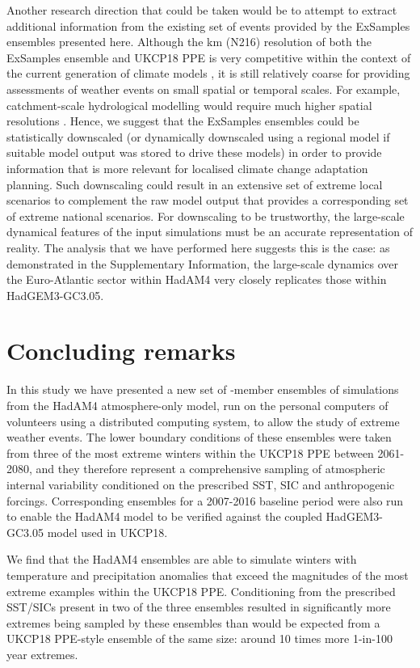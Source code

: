   Another research direction that could be taken would be to attempt to extract additional information from the existing set of events provided by the ExSamples ensembles presented here. Although the  km (N216) resolution of both the ExSamples ensemble and UKCP18 PPE is very competitive within the context of the current generation of climate models \citep{cmip6_source_id_values_cmip6_2022,eyring_overview_2016}, it is still relatively coarse for providing assessments of weather events on small spatial or temporal scales. For example, catchment-scale hydrological modelling would require much higher spatial resolutions \citep{charlton_assessing_2006}. Hence, we suggest that the ExSamples ensembles could be statistically downscaled (or dynamically downscaled using a regional model if suitable model output was stored to drive these models) in order to provide information that is more relevant for localised climate change adaptation planning. Such downscaling could result in an extensive set of extreme local scenarios to complement the raw model output that provides a corresponding set of extreme national scenarios. For downscaling to be trustworthy, the large-scale dynamical features of the input simulations must be an accurate representation of reality. The analysis that we have performed here suggests this is the case: as demonstrated in the Supplementary Information, the large-scale dynamics over the Euro-Atlantic sector within HadAM4 very closely replicates those within HadGEM3-GC3.05.
    
\section{Concluding remarks}

  In this study we have presented a new set of -member ensembles of simulations from the HadAM4 atmosphere-only model, run on the personal computers of volunteers using a distributed computing system, to allow the study of extreme weather events. The lower boundary conditions of these ensembles were taken from three of the most extreme winters within the UKCP18 PPE between 2061-2080, and they therefore represent a comprehensive sampling of atmospheric internal variability conditioned on the prescribed SST, SIC and anthropogenic forcings. Corresponding ensembles for a 2007-2016 baseline period were also run to enable the HadAM4 model to be verified against the coupled HadGEM3-GC3.05 model used in UKCP18.
  
  We find that the HadAM4 ensembles are able to simulate winters with temperature and precipitation anomalies that exceed the magnitudes of the most extreme examples within the UKCP18 PPE. Conditioning from the prescribed SST/SICs present in two of the three ensembles resulted in significantly more extremes being sampled by these ensembles than would be expected from a UKCP18 PPE-style ensemble of the same size: around 10 times more 1-in-100 year extremes.
  
